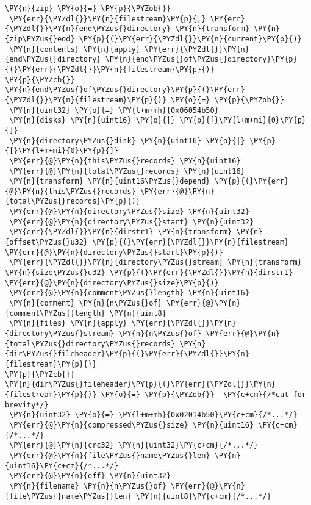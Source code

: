 \begin{Verbatim}[commandchars=\\\{\},codes={\catcode`\$=3\catcode`\^=7\catcode`\_=8}]
\PY{n}{zip} \PY{o}{=} \PY{p}{\PYZob{}} 
 \PY{err}{\PYZdl{}}\PY{n}{filestream}\PY{p}{,} \PY{err}{\PYZdl{}}\PY{n}{end\PYZus{}directory} \PY{n}{transform} \PY{n}{zip\PYZus{}eod} \PY{p}{(}\PY{err}{\PYZdl{}}\PY{n}{current}\PY{p}{)}
 \PY{n}{contents} \PY{n}{apply} \PY{err}{\PYZdl{}}\PY{n}{end\PYZus{}directory} \PY{n}{end\PYZus{}of\PYZus{}directory}\PY{p}{(}\PY{err}{\PYZdl{}}\PY{n}{filestream}\PY{p}{)}
\PY{p}{\PYZcb{}}
\PY{n}{end\PYZus{}of\PYZus{}directory}\PY{p}{(}\PY{err}{\PYZdl{}}\PY{n}{filestream}\PY{p}{)} \PY{o}{=} \PY{p}{\PYZob{}} 
 \PY{n}{uint32} \PY{o}{=} \PY{l+m+mh}{0x06054b50}
 \PY{n}{disks} \PY{n}{uint16} \PY{o}{|} \PY{p}{[}\PY{l+m+mi}{0}\PY{p}{]}
 \PY{n}{directory\PYZus{}disk} \PY{n}{uint16} \PY{o}{|} \PY{p}{[}\PY{l+m+mi}{0}\PY{p}{]}
 \PY{err}{@}\PY{n}{this\PYZus{}records} \PY{n}{uint16}
 \PY{err}{@}\PY{n}{total\PYZus{}records} \PY{n}{uint16} 
 \PY{n}{transform} \PY{n}{uint16\PYZus{}depend} \PY{p}{(}\PY{err}{@}\PY{n}{this\PYZus{}records} \PY{err}{@}\PY{n}{total\PYZus{}records}\PY{p}{)}
 \PY{err}{@}\PY{n}{directory\PYZus{}size} \PY{n}{uint32} 
 \PY{err}{@}\PY{n}{directory\PYZus{}start} \PY{n}{uint32}
 \PY{err}{\PYZdl{}}\PY{n}{dirstr1} \PY{n}{transform} \PY{n}{offset\PYZus{}u32} \PY{p}{(}\PY{err}{\PYZdl{}}\PY{n}{filestream} \PY{err}{@}\PY{n}{directory\PYZus{}start}\PY{p}{)} 
 \PY{err}{\PYZdl{}}\PY{n}{directory\PYZus{}stream} \PY{n}{transform} \PY{n}{size\PYZus{}u32} \PY{p}{(}\PY{err}{\PYZdl{}}\PY{n}{dirstr1} \PY{err}{@}\PY{n}{directory\PYZus{}size}\PY{p}{)}
 \PY{err}{@}\PY{n}{comment\PYZus{}length} \PY{n}{uint16}
 \PY{n}{comment} \PY{n}{n\PYZus{}of} \PY{err}{@}\PY{n}{comment\PYZus{}length} \PY{n}{uint8}
 \PY{n}{files} \PY{n}{apply} \PY{err}{\PYZdl{}}\PY{n}{directory\PYZus{}stream} \PY{n}{n\PYZus{}of} \PY{err}{@}\PY{n}{total\PYZus{}directory\PYZus{}records} \PY{n}{dir\PYZus{}fileheader}\PY{p}{(}\PY{err}{\PYZdl{}}\PY{n}{filestream}\PY{p}{)}
\PY{p}{\PYZcb{}}
\PY{n}{dir\PYZus{}fileheader}\PY{p}{(}\PY{err}{\PYZdl{}}\PY{n}{filestream}\PY{p}{)} \PY{o}{=} \PY{p}{\PYZob{}}  \PY{c+cm}{/*cut for brevity*/}
 \PY{n}{uint32} \PY{o}{=} \PY{l+m+mh}{0x02014b50}\PY{c+cm}{/*...*/}
 \PY{err}{@}\PY{n}{compressed\PYZus{}size} \PY{n}{uint16} \PY{c+cm}{/*...*/}
 \PY{err}{@}\PY{n}{crc32} \PY{n}{uint32}\PY{c+cm}{/*...*/}
 \PY{err}{@}\PY{n}{file\PYZus{}name\PYZus{}len} \PY{n}{uint16}\PY{c+cm}{/*...*/}
 \PY{err}{@}\PY{n}{off} \PY{n}{uint32}
 \PY{n}{filename} \PY{n}{n\PYZus{}of} \PY{err}{@}\PY{n}{file\PYZus{}name\PYZus{}len} \PY{n}{uint8}\PY{c+cm}{/*...*/}

\end{Verbatim}
